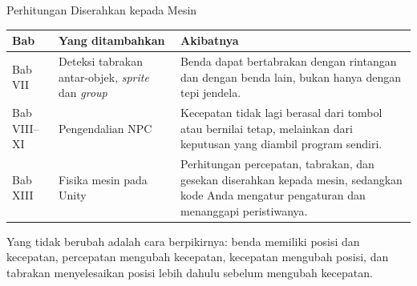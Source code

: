 \documentclass[aspectratio=169,10pt]{beamer}
\begin{document}
\begin{frame}{Perhitungan Diserahkan kepada Mesin}
{\scriptsize
\renewcommand{\arraystretch}{1.16}
\begin{tabularx}{\textwidth}{@{}>{\raggedright\arraybackslash}p{2.2cm}
    >{\raggedright\arraybackslash}p{5.6cm}
    >{\raggedright\arraybackslash}X@{}}
\toprule
\textbf{Bab} & \textbf{Yang ditambahkan} & \textbf{Akibatnya} \\
\midrule
Bab VII & Deteksi tabrakan antar-objek, \emph{sprite} dan \emph{group} &
  Benda dapat bertabrakan dengan rintangan dan dengan benda lain, bukan hanya
  dengan tepi jendela. \\
\addlinespace
Bab VIII--XI & Pengendalian NPC &
  Kecepatan tidak lagi berasal dari tombol atau bernilai tetap, melainkan dari
  keputusan yang diambil program sendiri. \\
\addlinespace
Bab XIII & Fisika mesin pada Unity &
  Perhitungan percepatan, tabrakan, dan gesekan diserahkan kepada mesin,
  sedangkan kode Anda mengatur pengaturan dan menanggapi peristiwanya. \\
\bottomrule
\end{tabularx}}
\vspace{0.14cm}
\begin{kotak}
Yang tidak berubah adalah cara berpikirnya: benda memiliki posisi dan kecepatan,
percepatan mengubah kecepatan, kecepatan mengubah posisi, dan tabrakan
menyelesaikan posisi lebih dahulu sebelum mengubah kecepatan.
\end{kotak}
\end{frame}
\end{document}
